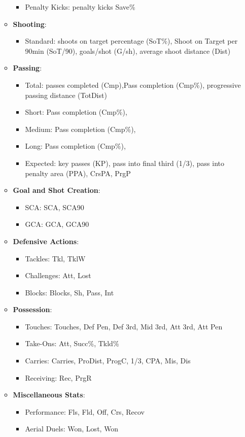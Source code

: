 \documentclass[12pt, letterpaper]{article}
\begin{document}
\begin{itemize}
\begin{itemize}[label=$\circ$]
\begin{itemize}
            \item Penalty Kicks: penalty kicks Save\%
        \end{itemize}
        \item \textbf{Shooting}:
        \begin{itemize}
            \item Standard: shoots on target percentage (SoT\%), Shoot on Target per 90min
(SoT/90), goals/shot (G/sh), average shoot distance (Dist)
        \end{itemize}
        \item \textbf{Passing}:
        \begin{itemize}
            \item Total: passes completed (Cmp),Pass completion (Cmp\%), progressive
passing distance (TotDist)
            \item Short: Pass completion (Cmp\%),
            \item Medium: Pass completion (Cmp\%),
            \item Long: Pass completion (Cmp\%),
            \item Expected: key passes (KP), pass into final third (1/3), pass into penalty
area (PPA), CrsPA, PrgP
        \end{itemize}
        \item \textbf{Goal and Shot Creation}:
        \begin{itemize}
            \item SCA: SCA, SCA90
            \item GCA: GCA, GCA90
        \end{itemize}
        \item \textbf{Defensive Actions}:
        \begin{itemize}
            \item Tackles: Tkl, TklW
            \item Challenges: Att, Lost
            \item Blocks: Blocks, Sh, Pass, Int
        \end{itemize}
        \item \textbf{Possession}:
        \begin{itemize}
            \item Touches: Touches, Def Pen, Def 3rd, Mid 3rd, Att 3rd, Att Pen
            \item Take-Ons: Att, Succ\%, Tkld\%
            \item Carries: Carries, ProDist, ProgC, 1/3, CPA, Mis, Dis
            \item Receiving: Rec, PrgR
        \end{itemize}
        \item \textbf{Miscellaneous Stats}:
        \begin{itemize}
            \item Performance: Fls, Fld, Off, Crs, Recov
            \item Aerial Duels: Won, Lost, Won%
        \end{itemize}
    \end{itemize}
\end{itemize}
\end{document}

